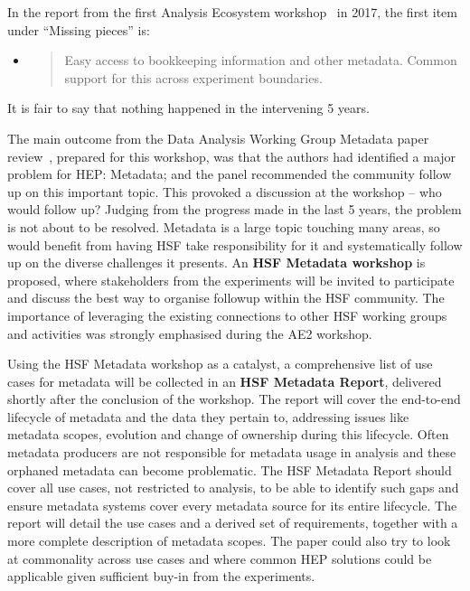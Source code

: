\documentclass[a4paper,11pt]{article}
\begin{document}
In the report from
the first Analysis Ecosystem workshop~\cite{elmer_peter_2017_6599290} in 2017, the first item under
``Missing pieces'' is:

\begin{itemize}
\item
  \begin{quote}
  Easy access to bookkeeping information and other metadata. Common
  support for this across experiment boundaries.
  \end{quote}
\end{itemize}

It is fair to say that nothing happened in the intervening 5 years.

The main outcome from the Data Analysis Working Group Metadata paper
review~\cite{Khoo:2022pja}, prepared for
this workshop, was that the authors had identified a major problem for
HEP: Metadata; and the panel recommended the community follow up on this
important topic. This provoked a discussion at the workshop -- who would
follow up? Judging from the progress made in the last 5 years, the
problem is not about to be resolved. Metadata is a large topic touching
many areas, so would benefit from having HSF take responsibility for it
and systematically follow up on the diverse challenges it presents. An
\textbf{HSF Metadata workshop} is proposed, where stakeholders from the
experiments will be invited to participate and discuss the best way to
organise followup within the HSF community. The importance of leveraging
the existing connections to other HSF working groups and activities was
strongly emphasised during the AE2 workshop.

Using the HSF Metadata workshop as a catalyst, a comprehensive list of
use cases for metadata will be collected in an \textbf{HSF Metadata
Report}, delivered shortly after the conclusion of the workshop. The
report will cover the end-to-end lifecycle of metadata and the data they
pertain to, addressing issues like metadata scopes, evolution and change
of ownership during this lifecycle. Often metadata producers are not
responsible for metadata usage in analysis and these orphaned metadata
can become problematic. The HSF Metadata Report should cover all use
cases, not restricted to analysis, to be able to identify such gaps and
ensure metadata systems cover every metadata source for its entire
lifecycle. The report will detail the use cases and a derived set of
requirements, together with a more complete description of metadata
scopes. The paper could also try to look at commonality across use cases
and where common HEP solutions could be applicable given sufficient
buy-in from the experiments.
\end{document}
